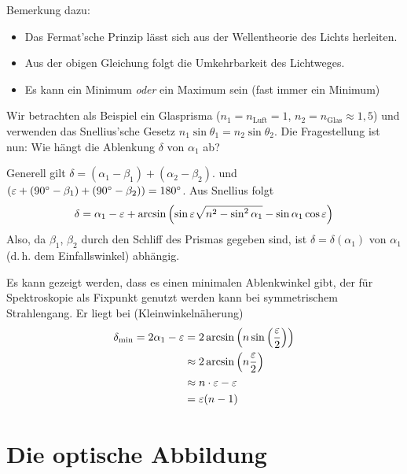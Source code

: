 Bemerkung dazu:
\begin{itemize}
\item Das Fermat'sche Prinzip lässt sich aus der Wellentheorie des
  Lichts herleiten.
\item Aus der obigen Gleichung folgt die Umkehrbarkeit des Lichtweges.
\item Es kann ein Minimum \emph{oder} ein Maximum sein (fast immer ein
  Minimum)
\end{itemize}


Wir betrachten als Beispiel ein Glasprisma ($n_1=n_\text{Luft}=1$,
$n_2=n_\text{Glas}\approx 1,5$) und verwenden das Snellius'sche Gesetz
$n_1\sin\theta_1 = n_2\sin\theta_2$.
Die Fragestellung ist nun: Wie hängt die Ablenkung $\delta$ von
$\alpha_1$ ab?

Generell gilt $\delta = (\alpha_1-\beta_1)+(\alpha_2-\beta_2)$.
und $(\varepsilon+(\ang{90}-\beta_1)+(\ang{90}-\beta_2))=\ang{180}$.
Aus Snellius folgt
\begin{gather*}
  \delta = \alpha_1 - \varepsilon
  + \arcsin\left(
    \sin\varepsilon\sqrt{n^2-\sin^2\alpha_1}-\sin\alpha_1\cos\varepsilon
    \right)
\end{gather*}
Also, da $\beta_1$, $\beta_2$ durch den Schliff des Prismas gegeben
sind, ist $\delta=\delta(\alpha_1)$ von $\alpha_1$ (d.\,h. dem
Einfallswinkel) abhängig.

Es kann gezeigt werden, dass es einen minimalen Ablenkwinkel gibt, der
für Spektroskopie als Fixpunkt genutzt werden kann bei symmetrischem
Strahlengang. Er liegt bei (Kleinwinkelnäherung)
\begin{align*}
  \delta_\text{min} 
  = 2\alpha_1-\varepsilon 
  &= 2\arcsin\left(n\sin\left(\frac{\varepsilon}{2}\right)\right)\\
  &\approx 2\arcsin\left(n\frac{\varepsilon}{2}\right)\\
  &\approx n\cdot\varepsilon - \varepsilon \\
  &= \varepsilon(n-1)
\end{align*}



\section{Die optische Abbildung}
